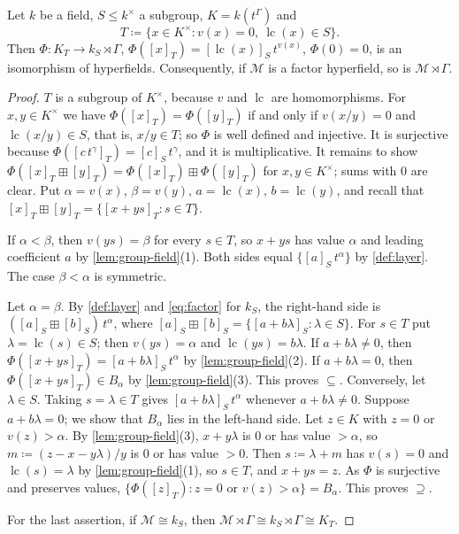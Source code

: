 \documentclass[11pt]{amsart}
\numberwithin{equation}{section}
\newcommand{\hplus}{\boxplus}
\newcommand{\Mas}{\mathcal M}
\newcommand{\cls}[1]{[#1]}
\newcommand{\lt}[2]{#1\,t^{#2}}
\begin{document}
\begin{proposition}\label{prop:lift}
Let $k$ be a field, $S\le k^\times$ a subgroup, $K=k(t^\Gamma)$ and
\[
  T\coloneqq\{x\in K^\times: v(x)=0,\ \operatorname{lc}(x)\in S\}.
\]
Then $\Phi\colon K_T\to k_S\rtimes\Gamma$, $\Phi(\cls x_T)=\cls{\operatorname{lc}(x)}_S\,t^{v(x)}$, $\Phi(0)=0$, is an isomorphism of hyperfields. Consequently, if $\Mas$ is a factor hyperfield, so is $\Mas\rtimes\Gamma$.
\end{proposition}

\begin{proof}
$T$ is a subgroup of $K^\times$, because $v$ and $\operatorname{lc}$ are homomorphisms. For $x,y\in K^\times$ we have $\Phi(\cls x_T)=\Phi(\cls y_T)$ if and only if $v(x/y)=0$ and $\operatorname{lc}(x/y)\in S$, that is, $x/y\in T$; so $\Phi$ is well defined and injective. It is surjective because $\Phi(\cls{c\,t^\gamma}_T)=\cls c_S\,t^\gamma$, and it is multiplicative. It remains to show $\Phi(\cls x_T\hplus\cls y_T)=\Phi(\cls x_T)\hplus\Phi(\cls y_T)$ for $x,y\in K^\times$; sums with $0$ are clear. Put $\alpha=v(x)$, $\beta=v(y)$, $a=\operatorname{lc}(x)$, $b=\operatorname{lc}(y)$, and recall that $\cls x_T\hplus\cls y_T=\{\cls{x+ys}_T:s\in T\}$.

If $\alpha<\beta$, then $v(ys)=\beta$ for every $s\in T$, so $x+ys$ has value $\alpha$ and leading coefficient $a$ by \cref{lem:group-field}(1). Both sides equal $\{\cls a_S\,t^\alpha\}$ by \cref{def:layer}. The case $\beta<\alpha$ is symmetric.

Let $\alpha=\beta$. By \cref{def:layer} and \eqref{eq:factor} for $k_S$, the right-hand side is $\lt{(\cls a_S\hplus\cls b_S)}{\alpha}$, where $\cls a_S\hplus\cls b_S=\{\cls{a+b\lambda}_S:\lambda\in S\}$. For $s\in T$ put $\lambda=\operatorname{lc}(s)\in S$; then $v(ys)=\alpha$ and $\operatorname{lc}(ys)=b\lambda$. If $a+b\lambda\ne0$, then $\Phi(\cls{x+ys}_T)=\cls{a+b\lambda}_S\,t^\alpha$ by \cref{lem:group-field}(2). If $a+b\lambda=0$, then $\Phi(\cls{x+ys}_T)\in B_\alpha$ by \cref{lem:group-field}(3). This proves $\subseteq$. Conversely, let $\lambda\in S$. Taking $s=\lambda\in T$ gives $\cls{a+b\lambda}_S\,t^\alpha$ whenever $a+b\lambda\ne0$. Suppose $a+b\lambda=0$; we show that $B_\alpha$ lies in the left-hand side. Let $z\in K$ with $z=0$ or $v(z)>\alpha$. By \cref{lem:group-field}(3), $x+y\lambda$ is $0$ or has value $>\alpha$, so $m\coloneqq(z-x-y\lambda)/y$ is $0$ or has value $>0$. Then $s\coloneqq\lambda+m$ has $v(s)=0$ and $\operatorname{lc}(s)=\lambda$ by \cref{lem:group-field}(1), so $s\in T$, and $x+ys=z$. As $\Phi$ is surjective and preserves values, $\{\Phi(\cls z_T):z=0\text{ or }v(z)>\alpha\}=B_\alpha$. This proves $\supseteq$.

For the last assertion, if $\Mas\cong k_S$, then $\Mas\rtimes\Gamma\cong k_S\rtimes\Gamma\cong K_T$.
\end{proof}
\end{document}
